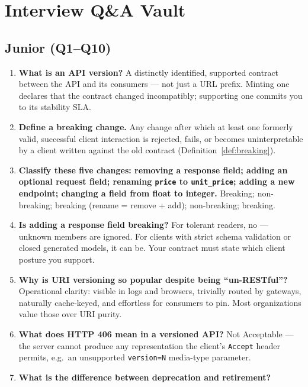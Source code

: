 \section{Interview Q\&A Vault}
\label{sec:ch9-interview}

\subsection*{Junior (Q1--Q10)}
\begin{enumerate}[label=\textbf{Q\arabic*.}, leftmargin=1.6cm]
  \item \textbf{What is an API version?}
        A distinctly identified, supported contract between the API and its
        consumers --- not just a URL prefix. Minting one declares that the
        contract changed incompatibly; supporting one commits you to its
        stability SLA.
  \item \textbf{Define a breaking change.}
        Any change after which at least one formerly valid, successful client
        interaction is rejected, fails, or becomes uninterpretable by a
        client written against the old contract (Definition~\ref{def:breaking}).
  \item \textbf{Classify these five changes: removing a response field;
        adding an optional request field; renaming \texttt{price} to
        \texttt{unit\_price}; adding a new endpoint; changing a field from
        float to integer.}
        Breaking; non-breaking; breaking (rename = remove + add);
        non-breaking; breaking.
  \item \textbf{Is adding a response field breaking?}
        For tolerant readers, no --- unknown members are ignored. For clients
        with strict schema validation or closed generated models, it can be.
        Your contract must state which client posture you support.
  \item \textbf{Why is URI versioning so popular despite being ``un-RESTful''?}
        Operational clarity: visible in logs and browsers, trivially routed
        by gateways, naturally cache-keyed, and effortless for consumers to
        pin. Most organizations value those over URI purity.
  \item \textbf{What does HTTP 406 mean in a versioned API?}
        Not Acceptable --- the server cannot produce any representation the
        client's \texttt{Accept} header permits, e.g.\ an unsupported
        \texttt{version=N} media-type parameter.
  \item \textbf{What is the difference between deprecation and retirement?}

\end{enumerate}
